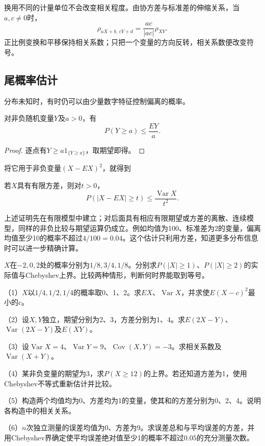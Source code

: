 换用不同的计量单位不会改变相关程度。由协方差与标准差的伸缩关系，当\(a,c\ne0\)时，
\[
 \rho_{aX+b,\,cY+d}=\frac{ac}{|ac|}\rho_{XY}.
\]
正比例变换和平移保持相关系数；只把一个变量的方向反转，相关系数便改变符号。

\newpage
\subsection{尾概率估计}

分布未知时，有时仍可以由少量数字特征控制偏离的概率。

\begin{theorem}[Markov不等式]
对非负随机变量\(Y\)及\(a>0\)，有
\begin{equation}\label{eq:prob-markov-bound}
 P(Y\ge a)\le\frac{EY}{a}.
\end{equation}
\end{theorem}

\begin{proof}
逐点有\(Y\ge a1_{\{Y\ge a\}}\)，取期望即得。
\end{proof}

将它用于非负变量\((X-EX)^2\)，就得到
\begin{theorem}[Chebyshev不等式]\label{thm:prob-chebyshev}
若\(X\)具有有限方差，则对\(t>0\)，
\begin{equation}\label{eq:prob-chebyshev}
 P(|X-EX|\ge t)\le\frac{\operatorname{Var}X}{t^2}.
\end{equation}
\end{theorem}

上述证明先在有限模型中建立；对后面具有相应有限期望或方差的离散、连续模型，同样的非负比较与期望运算仍成立。例如均值为100、标准差为2的变量，偏离均值至少10的概率不超过\(4/100=0.04\)。这个估计只利用方差，知道更多分布信息时可以进一步精确计算。

\begin{example}
\(X\)在\(-2,0,2\)处的概率分别为\(1/8,3/4,1/8\)。分别求\(P(|X|\ge1)\)、\(P(|X|\ge2)\)的实际值与Chebyshev上界。比较两种情形，判断何时界能取到等号。
\end{example}

\begin{exercise}
\mbox{}\par\nobreak

（1）\(X\)以\(1/4,1/2,1/4\)的概率取0、1、2。求\(EX\)、\(\operatorname{Var}X\)，并求使\(E(X-c)^2\)最小的\(c\)。

（2）设\(X,Y\)独立，期望分别为2、3，方差分别为1、4。求\(E(2X-Y)\)、\(\operatorname{Var}(2X-Y)\)及\(E(XY)\)。

（3）设\(\operatorname{Var}X=4\)、\(\operatorname{Var}Y=9\)、\(\operatorname{Cov}(X,Y)=-3\)。求相关系数及\(\operatorname{Var}(X+Y)\)。

（4）某非负变量的期望为3，求\(P(X\ge12)\)的上界。若还知道方差为1，使用Chebyshev不等式重新估计并比较。

（5）构造两个均值均为0、方差均为1的变量，使其和的方差分别为0、2、4。说明各构造中的相关关系。

（6）\(n\)次独立测量的误差均值为0、方差为9。求误差总和与平均误差的方差，并用Chebyshev界确定使平均误差绝对值至少1的概率不超过\(0.05\)的充分测量次数。
\end{exercise}

